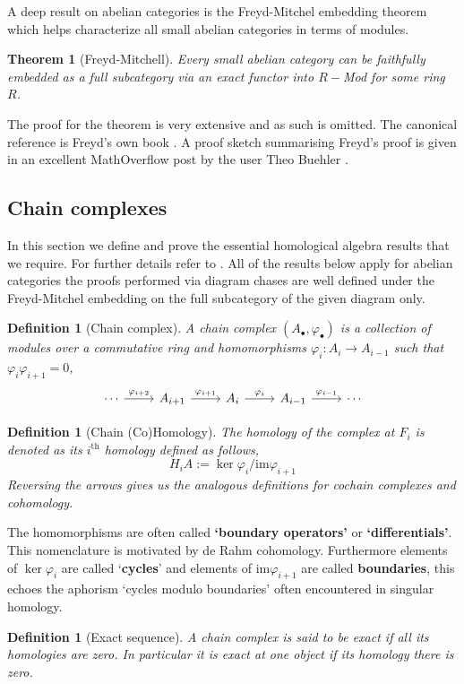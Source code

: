 \documentclass[12pt]{article}
\numberwithin{equation}{section}
\newcounter{dummy} \numberwithin{dummy}{section}
\newtheorem{theorem}[dummy]{Theorem}
\newtheorem{definition}[dummy]{Definition}
\begin{document}
	A deep result on abelian categories is the Freyd-Mitchel embedding theorem which helps characterize all small abelian categories in terms of modules.
	
	\begin{theorem}[Freyd-Mitchell]
		Every small abelian category can be faithfully embedded as a full subcategory via an exact functor into $R-$Mod for some ring $R$.
	\end{theorem}
	The proof for the theorem is very extensive and as such is omitted. The canonical reference is Freyd's own book \cite{freyd1964abelian}. A proof sketch summarising Freyd's proof is given in an excellent MathOverflow post by the user Theo Buehler \cite{47762}.
	
	\subsection{Chain complexes}
	In this section we define and prove the essential homological algebra results that we require. For further details refer to \cite{eisenbud2013commutative, weibel_1994}. All of the results below apply for abelian categories the proofs performed via diagram chases are well defined under the Freyd-Mitchel embedding on the full subcategory of the given diagram only.
	
	\begin{definition}[Chain complex]
		A {chain complex} $(A_\bullet, \varphi_\bullet)$ is a collection of modules over a commutative ring and homomorphisms $\varphi_i: A_i \to A_{i-1}$ such that $\varphi_i \varphi_{i+1}=0$,
		\[\begin{tikzcd}
			\cdots & {A_{i+1}} & {A_i} & {A_{i-1}} & \cdots
			\arrow["{\varphi_{i+1}}", from=1-2, to=1-3]
			\arrow["{\varphi_i}", from=1-3, to=1-4]
			\arrow["{\varphi_{i-1}}", from=1-4, to=1-5]
			\arrow["{\varphi_{i+2}}", from=1-1, to=1-2]
		\end{tikzcd}\]
	\end{definition}
	\begin{definition}[Chain (Co)Homology]
		The {homology} of the complex at $F_i$ is denoted as its $i^{\mathrm{th}}$ homology defined as follows,
		\[ H_iA := \ker \varphi_i/ \mathrm{im} \varphi_{i+1} \]
		Reversing the arrows gives us the analogous definitions for cochain complexes and cohomology.
	\end{definition}
	
	
	The homomorphisms are often called \textbf{`boundary operators'} or \textbf{`differentials'}. This nomenclature is motivated by de Rahm cohomology. Furthermore elements of $\ker \varphi_i$ are called `\textbf{cycles}' and elements of $\mathrm{im} \varphi_{i+1}$ are called \textbf{boundaries}, this echoes the aphorism `cycles modulo boundaries' often encountered in singular homology.
	\begin{definition}[Exact sequence]
		A chain complex is said to be {exact} if all its homologies are zero. In particular it is exact at one object if its homology there is zero.
	\end{definition}
	
\end{document}
